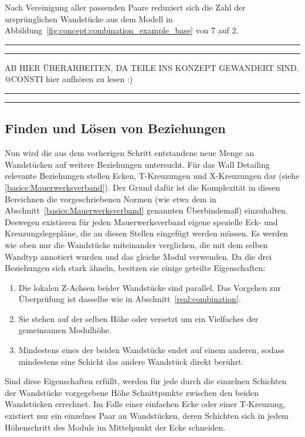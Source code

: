 Nach Vereinigung aller passenden Paare reduziert sich die Zahl der ursprünglichen Wandstücke aus dem Modell in Abbildung~\ref{fig:concept:combination_example_base} von 7 auf 2.

\par\noindent\rule{\textwidth}{0.4pt}
\par\noindent\rule{\textwidth}{0.4pt}
AB HIER ÜBERARBEITEN, DA TEILE INS KONZEPT GEWANDERT SIND. @CONSTI hier aufhören zu lesen :)
\par\noindent\rule{\textwidth}{0.4pt}
\par\noindent\rule{\textwidth}{0.4pt}

\subsection{Finden und Lösen von Beziehungen}
Nun wird die aus dem vorherigen Schritt entstandene neue Menge an Wandstücken auf weitere Beziehungen untersucht.
Für das Wall Detailing relevante Beziehungen stellen Ecken, T-Kreuzungen und X-Kreuzungen dar (siehe \ref{basics:Mauerwerksverband}).
Der Grund dafür ist die Komplexität in diesen Bereichnen die vorgeschriebenen Normen (wie etwa dem in Abschnitt~\ref{basics:Mauerwerksverband} genannten Überbindemaß) einzuhalten.
Deswegen existieren für jeden Mauerwerksverband eigene spezielle Eck- und Kreuzungslegepläne, die an diesen Stellen eingefügt werden müssen.
Es werden wie oben nur die Wandstücke miteinander verglichen, die mit dem selben Wandtyp annotiert wurden und das gleiche Modul verwenden.
Da die drei Beziehungen sich stark ähneln, besitzen sie einige geteilte Eigenschaften:
\begin{enumerate}
    \item Die lokalen Z-Achsen beider Wandstücke sind parallel. Das Vorgehen zur Überprüfung ist dasselbe wie in Abschnitt~\ref{real:combination}.
    \item Sie stehen auf der selben Höhe oder versetzt um ein Vielfaches der gemeinsamen Modulhöhe.
    \item Mindestens eines der beiden Wandstücke endet auf einem anderen, sodass mindestens eine Schicht das andere Wandstück direkt berührt.
\end{enumerate}
Sind diese Eigenschaften erfüllt, werden für jede durch die einzelnen Schichten der Wandstücke vorgegebene Höhe Schnittpunkte zwischen den beiden Wandstücken errechnet.
Im Falle einer einfachen Ecke oder einer T-Kreuzung, existiert nur ein einzelnes Paar an Wandstücken, deren Schichten sich in jedem Höhenschritt des Moduls im Mittelpunkt der Ecke schneiden.

